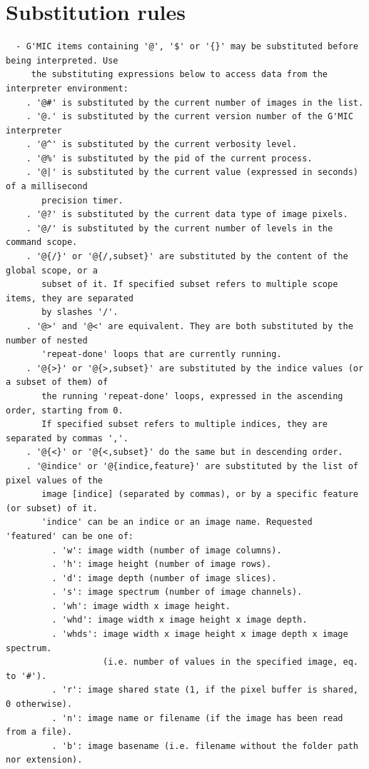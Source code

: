\documentclass[a4paper,11pt,twoside]{book}
\begin{document}
\section{Substitution rules}
\small
\begin{lstlisting}
  - G'MIC items containing '@', '$' or '{}' may be substituted before being interpreted. Use 
     the substituting expressions below to access data from the interpreter environment: 
    . '@#' is substituted by the current number of images in the list. 
    . '@.' is substituted by the current version number of the G'MIC interpreter 
    . '@^' is substituted by the current verbosity level. 
    . '@%' is substituted by the pid of the current process. 
    . '@|' is substituted by the current value (expressed in seconds) of a millisecond 
       precision timer. 
    . '@?' is substituted by the current data type of image pixels. 
    . '@/' is substituted by the current number of levels in the command scope. 
    . '@{/}' or '@{/,subset}' are substituted by the content of the global scope, or a 
       subset of it. If specified subset refers to multiple scope items, they are separated 
       by slashes '/'. 
    . '@>' and '@<' are equivalent. They are both substituted by the number of nested 
       'repeat-done' loops that are currently running. 
    . '@{>}' or '@{>,subset}' are substituted by the indice values (or a subset of them) of 
       the running 'repeat-done' loops, expressed in the ascending order, starting from 0. 
       If specified subset refers to multiple indices, they are separated by commas ','. 
    . '@{<}' or '@{<,subset}' do the same but in descending order. 
    . '@indice' or '@{indice,feature}' are substituted by the list of pixel values of the 
       image [indice] (separated by commas), or by a specific feature (or subset) of it. 
       'indice' can be an indice or an image name. Requested 'featured' can be one of: 
         . 'w': image width (number of image columns). 
         . 'h': image height (number of image rows). 
         . 'd': image depth (number of image slices). 
         . 's': image spectrum (number of image channels). 
         . 'wh': image width x image height. 
         . 'whd': image width x image height x image depth. 
         . 'whds': image width x image height x image depth x image spectrum. 
                   (i.e. number of values in the specified image, eq. to '#'). 
         . 'r': image shared state (1, if the pixel buffer is shared, 0 otherwise). 
         . 'n': image name or filename (if the image has been read from a file). 
         . 'b': image basename (i.e. filename without the folder path nor extension). 

\end{lstlisting}
\end{document}
